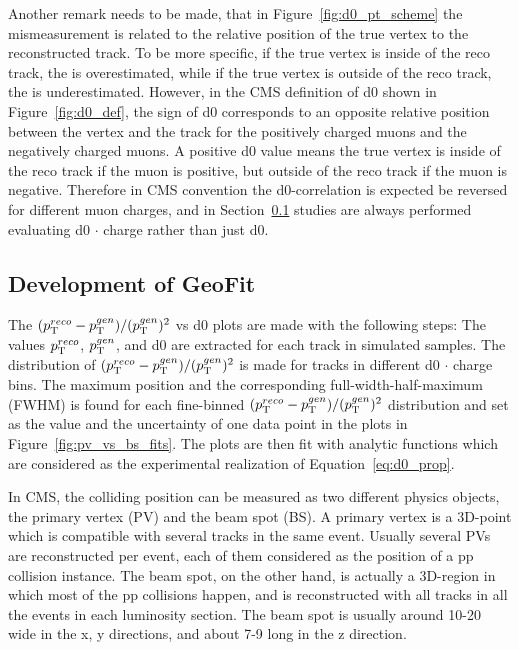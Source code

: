 Another remark needs to be made, that in Figure~\ref{fig:d0_pt_scheme} the \pt mismeasurement is related to the relative position of the true vertex to the reconstructed track.
To be more specific, if the true vertex is inside of the reco track, the \pt is overestimated, 
while if the true vertex is outside of the reco track, the \pt is underestimated. 
However, in the CMS definition of d0 shown in Figure~\ref{fig:d0_def}, the sign of d0 corresponds to an opposite relative position between the vertex and the track
for the positively charged muons and the negatively charged muons. 
A positive d0 value means the true vertex is inside of the reco track if the muon is positive, but outside of the reco track if the muon is negative.
Therefore in CMS convention the d0-\pt correlation is expected be reversed for different muon charges,
and in Section~\ref{sec:dev_geofit} studies are always performed evaluating d0 $\cdot$ charge rather than just d0.

\subsection{Development of GeoFit}\label{sec:dev_geofit}

The $(p_{\mathrm{T}}^{reco}-p_{\mathrm{T}}^{gen})/ (p_{\mathrm{T}}^{gen})^{2}$ vs d0 plots are made with the following steps:
The values $p_{\mathrm{T}}^{reco}$, $p_{\mathrm{T}}^{gen}$, and d0 are extracted for each track in simulated samples.
The distribution of $(p_{\mathrm{T}}^{reco}-p_{\mathrm{T}}^{gen})/ (p_{\mathrm{T}}^{gen})^{2}$ is made for tracks in different d0 $\cdot$ charge bins.
The maximum position and the corresponding full-width-half-maximum (FWHM) is found for each 
fine-binned $(p_{\mathrm{T}}^{reco}-p_{\mathrm{T}}^{gen})/ (p_{\mathrm{T}}^{gen})^{2}$ distribution and set as the value and the uncertainty
of one data point in the plots in Figure~\ref{fig:pv_vs_bs_fits}.
The plots are then fit with analytic functions which are considered as the experimental realization of Equation~\ref{eq:d0_prop}.

In CMS, the colliding position can be measured as two different physics objects, the primary vertex (PV) and the beam spot (BS).
A primary vertex is a 3D-point which is compatible with several tracks in the same event.
Usually several PVs are reconstructed per event, each of them considered as the position of a pp collision instance.
The beam spot, on the other hand, is actually a 3D-region in which most of the pp collisions happen,
and is reconstructed with all tracks in all the events in each luminosity section.
The beam spot is usually around 10-20 \mum wide in the x, y directions, and about 7-9 \cm long in the z direction.

